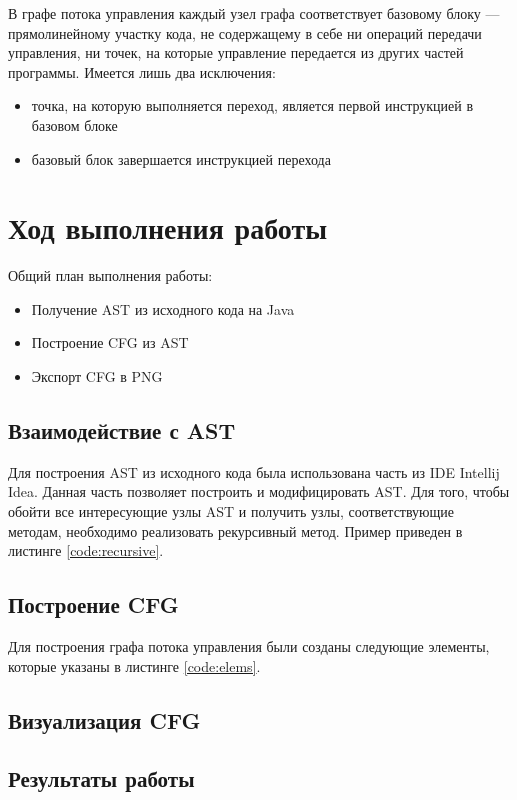 В графе потока управления каждый узел графа соответствует базовому блоку --- прямолинейному участку кода, не содержащему в себе ни операций передачи управления, ни точек, на которые управление передается из других частей программы. Имеется лишь два исключения:
\begin{itemize}
\item точка, на которую выполняется переход, является первой инструкцией в базовом блоке
\item базовый блок завершается инструкцией перехода
\end{itemize}

\section{Ход выполнения работы}

Общий план выполнения работы:
\begin{itemize}
\item Получение AST из исходного кода на Java
\item Построение CFG из AST
\item Экспорт CFG в PNG
\end{itemize}

\subsection{Взаимодействие с AST}

Для построения AST из исходного кода была использована часть из IDE Intellij Idea. Данная часть позволяет построить и модифицировать AST. Для того, чтобы обойти все интересующие узлы AST и получить узлы, соответствующие методам, необходимо реализовать рекурсивный метод. Пример приведен в листинге \ref{code:recursive}. 


\parindent=1cm

\subsection{Построение CFG}

Для построения графа потока управления были созданы следующие элементы, которые указаны в листинге \ref{code:elems}.


\subsection{Визуализация CFG}
\subsection{Результаты работы}

